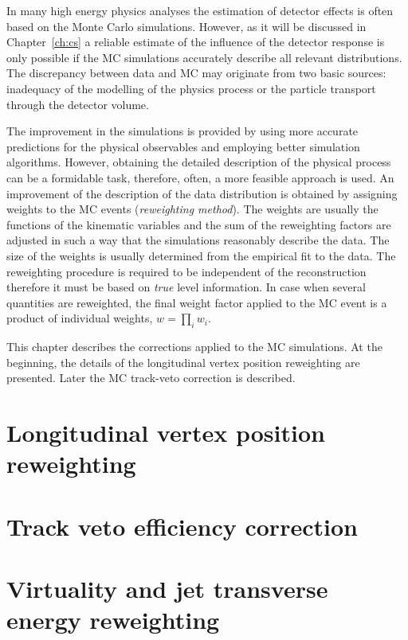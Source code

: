  In many high energy physics analyses the estimation of detector effects is often based on the Monte Carlo simulations. However, as it will be discussed in Chapter~\ref{ch:cs} a reliable estimate of the influence of the detector response is only possible if the MC simulations accurately describe all relevant distributions. %
 The discrepancy between data and MC may originate from two basic sources: inadequacy of the modelling of the physics process or the particle transport through the detector volume.
 
 The improvement in the simulations is provided by using more accurate predictions for the physical observables and employing better simulation algorithms. However, obtaining the detailed description of the physical process can be a formidable task, therefore, often, a more feasible approach is used. An improvement of the description of the data distribution is obtained by assigning weights to the MC events (\emph{reweighting method}). The weights are usually the functions of the kinematic variables and the sum of the reweighting factors are adjusted in such a way that the simulations reasonably describe the data. The size of the weights is usually determined from the empirical fit to the data. The reweighting procedure is required to be independent of the reconstruction therefore it must be based on \emph{true} level information. In case when several quantities are reweighted, the final weight factor applied to the MC event is a product of individual weights, $w = \prod_i w_i$.
 
 This chapter describes the corrections applied to the MC simulations. At the beginning, the details of the longitudinal vertex position reweighting are presented. Later the MC track-veto correction is described.

 \section{Longitudinal vertex position reweighting}
 
 
 \section{Track veto efficiency correction}
 

\section{Virtuality and jet transverse energy reweighting}
\label{sec:q2etrew}

 \newpage

